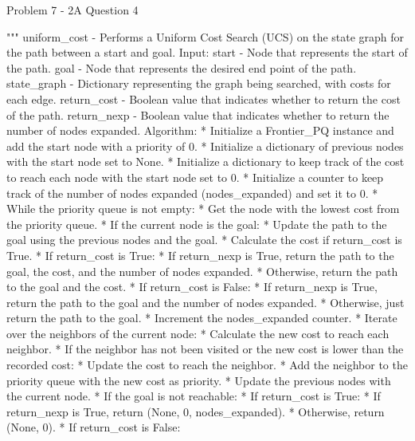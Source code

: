 \begin{problem}{Problem 7 - 2A Question 4}
\begin{highlight}[Solution]
\begin{code}[Python]
    """ uniform_cost - Performs a Uniform Cost Search (UCS) on the state graph for the path between a start and goal.
        Input:
            start - Node that represents the start of the path.
            goal - Node that represents the desired end point of the path.
            state_graph - Dictionary representing the graph being searched, with costs for each edge.
            return_cost - Boolean value that indicates whether to return the cost of the path.
            return_nexp - Boolean value that indicates whether to return the number of nodes expanded.
        Algorithm:
            * Initialize a Frontier_PQ instance and add the start node with a priority of 0.
            * Initialize a dictionary of previous nodes with the start node set to None.
            * Initialize a dictionary to keep track of the cost to reach each node with the start node set to 0.
            * Initialize a counter to keep track of the number of nodes expanded (nodes_expanded) and set it to 0.
            * While the priority queue is not empty:
                * Get the node with the lowest cost from the priority queue.
                * If the current node is the goal:
                    * Update the path to the goal using the previous nodes and the goal.
                    * Calculate the cost if return_cost is True.
                    * If return_cost is True:
                        * If return_nexp is True, return the path to the goal, the cost, and the number of nodes expanded.
                        * Otherwise, return the path to the goal and the cost.
                    * If return_cost is False:
                        * If return_nexp is True, return the path to the goal and the number of nodes expanded.
                        * Otherwise, just return the path to the goal.
                * Increment the nodes_expanded counter.
                * Iterate over the neighbors of the current node:
                    * Calculate the new cost to reach each neighbor.
                    * If the neighbor has not been visited or the new cost is lower than the recorded cost:
                        * Update the cost to reach the neighbor.
                        * Add the neighbor to the priority queue with the new cost as priority.
                        * Update the previous nodes with the current node.
            * If the goal is not reachable:
                * If return_cost is True:
                    * If return_nexp is True, return (None, 0, nodes_expanded).
                    * Otherwise, return (None, 0).
                * If return_cost is False:

\end{code}
\end{highlight}
\end{problem}
